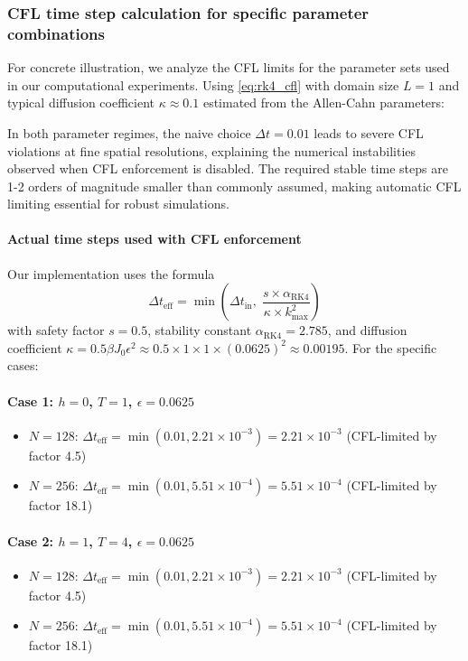 \documentclass[11pt,a4paper]{article}
\begin{document}
\subsubsection{CFL time step calculation for specific parameter combinations}

For concrete illustration, we analyze the CFL limits for the parameter sets used in our computational experiments. Using \eqref{eq:rk4_cfl} with domain size $L=1$ and typical diffusion coefficient $\kappa \approx 0.1$ estimated from the Allen-Cahn parameters:

In both parameter regimes, the naive choice $\Delta t = 0.01$ leads to severe CFL violations at fine spatial resolutions, explaining the numerical instabilities observed when CFL enforcement is disabled. The required stable time steps are 1-2 orders of magnitude smaller than commonly assumed, making automatic CFL limiting essential for robust simulations.

\paragraph{Actual time steps used with CFL enforcement} Our implementation uses the formula
\[
\Delta t_\text{eff} = \min\!\left( \Delta t_\text{in},\; \frac{s \times \alpha_\text{RK4}}{\kappa \times k_\text{max}^2} \right)
\]
with safety factor $s = 0.5$, stability constant $\alpha_\text{RK4} = 2.785$, and diffusion coefficient $\kappa = 0.5 \beta J_0 \epsilon^2 \approx 0.5 \times 1 \times 1 \times (0.0625)^2 \approx 0.00195$. For the specific cases:

\paragraph{Case 1: $h=0$, $T=1$, $\epsilon=0.0625$}
\begin{itemize}
\item $N=128$: $\Delta t_\text{eff} = \min(0.01, 2.21 \times 10^{-3}) = 2.21 \times 10^{-3}$ (CFL-limited by factor 4.5)
\item $N=256$: $\Delta t_\text{eff} = \min(0.01, 5.51 \times 10^{-4}) = 5.51 \times 10^{-4}$ (CFL-limited by factor 18.1)
\end{itemize}

\paragraph{Case 2: $h=1$, $T=4$, $\epsilon=0.0625$}
\begin{itemize}
\item $N=128$: $\Delta t_\text{eff} = \min(0.01, 2.21 \times 10^{-3}) = 2.21 \times 10^{-3}$ (CFL-limited by factor 4.5)
\item $N=256$: $\Delta t_\text{eff} = \min(0.01, 5.51 \times 10^{-4}) = 5.51 \times 10^{-4}$ (CFL-limited by factor 18.1)
\end{itemize}
\end{document}
